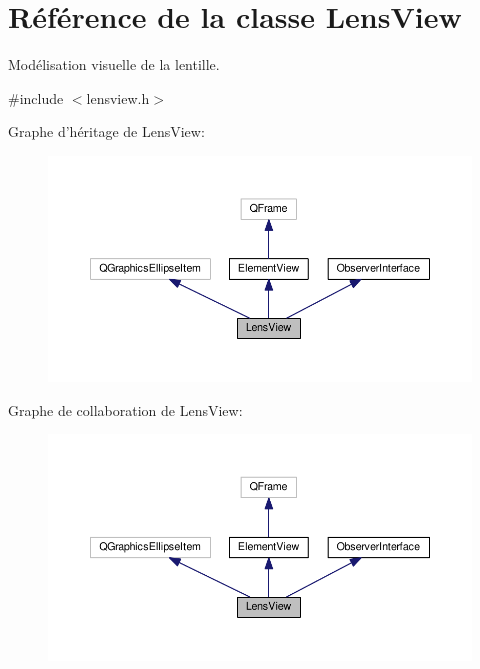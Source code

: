 \hypertarget{classLensView}{\section{Référence de la classe Lens\+View}
\label{classLensView}
}


Modélisation visuelle de la lentille.  




{\ttfamily \#include $<$lensview.\+h$>$}



Graphe d'héritage de Lens\+View\+:\nopagebreak
\begin{figure}[H]
\begin{center}
\leavevmode
\includegraphics[width=350pt]{d3/d0e/classLensView__inherit__graph}
\end{center}
\end{figure}


Graphe de collaboration de Lens\+View\+:\nopagebreak
\begin{figure}[H]
\begin{center}
\leavevmode
\includegraphics[width=350pt]{d3/d32/classLensView__coll__graph}
\end{center}
\end{figure}
